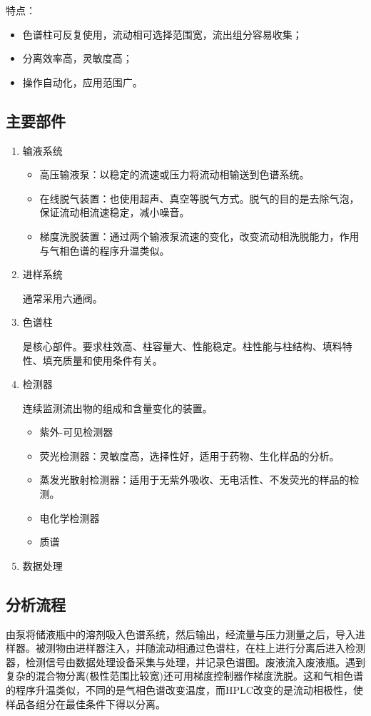 特点：
\begin{itemize}
	\item 色谱柱可反复使用，流动相可选择范围宽，流出组分容易收集；
	\item 分离效率高，灵敏度高；
	\item 操作自动化，应用范围广。
\end{itemize}

\subsection{主要部件}
\begin{enumerate}
	\item 输液系统
	\begin{itemize}
		\item 高压输液泵：以稳定的流速或压力将流动相输送到色谱系统。
		\item 在线脱气装置：也使用超声、真空等脱气方式。脱气的目的是去除气泡，保证流动相流速稳定，减小噪音。
		\item 梯度洗脱装置：通过两个输液泵流速的变化，改变流动相洗脱能力，作用与气相色谱的程序升温类似。
	\end{itemize}
	\item 进样系统
	
	通常采用六通阀。
	\item 色谱柱
	
	是核心部件。要求柱效高、柱容量大、性能稳定。柱性能与柱结构、填料特性、填充质量和使用条件有关。
	\item 检测器
	
	连续监测流出物的组成和含量变化的装置。
	\begin{itemize}
		\item 紫外-可见检测器
		\item 荧光检测器：灵敏度高，选择性好，适用于药物、生化样品的分析。
		\item 蒸发光散射检测器：适用于无紫外吸收、无电活性、不发荧光的样品的检测。
		\item 电化学检测器
		\item 质谱
	\end{itemize}
	\item 数据处理
\end{enumerate}

\subsection{分析流程}
由泵将储液瓶中的溶剂吸入色谱系统，然后输出，经流量与压力测量之后，导入进样器。被测物由进样器注入，并随流动相通过色谱柱，在柱上进行分离后进入检测器，检测信号由数据处理设备采集与处理，并记录色谱图。废液流入废液瓶。遇到复杂的混合物分离(极性范围比较宽)还可用梯度控制器作梯度洗脱。这和气相色谱的程序升温类似，不同的是气相色谱改变温度，而HPLC改变的是流动相极性，使样品各组分在最佳条件下得以分离。

